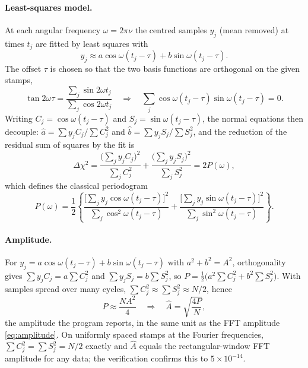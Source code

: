 \documentclass[10pt,letterpaper]{article}
\numberwithin{equation}{section}
\begin{document}
\paragraph{Least-squares model.} At each angular frequency $\omega = 2\pi\nu$ the
centred samples $y_j$ (mean removed) at times $t_j$ are fitted by least squares
\cite{B38,R13} with
\begin{equation}
y_j \approx a\cos\omega(t_j-\tau) + b\sin\omega(t_j-\tau).
\end{equation}
The offset $\tau$ is chosen so that the two basis functions are orthogonal on
the given stamps,
\begin{equation}
\tan 2\omega\tau = \frac{\sum_j \sin 2\omega t_j}{\sum_j \cos 2\omega t_j}
\quad\Longrightarrow\quad \sum_j \cos\omega(t_j-\tau)\sin\omega(t_j-\tau) = 0 .
\end{equation}
Writing $C_j = \cos\omega(t_j-\tau)$ and $S_j = \sin\omega(t_j-\tau)$, the normal
equations then decouple: $\hat{a} = \sum y_j C_j/\sum C_j^2$ and
$\hat{b} = \sum y_j S_j/\sum S_j^2$, and the reduction of the residual sum of
squares by the fit is
\begin{equation}
\Delta\chi^2 = \frac{\big(\sum_j y_j C_j\big)^2}{\sum_j C_j^2} + \frac{\big(\sum_j y_j S_j\big)^2}{\sum_j S_j^2} = 2P(\omega),
\end{equation}
which defines the classical periodogram
\begin{equation}
P(\omega) = \frac12\left\{\frac{\big[\sum_j y_j\cos\omega(t_j-\tau)\big]^2}{\sum_j\cos^2\omega(t_j-\tau)}
 + \frac{\big[\sum_j y_j\sin\omega(t_j-\tau)\big]^2}{\sum_j\sin^2\omega(t_j-\tau)}\right\}.
\end{equation}

\paragraph{Amplitude.} For $y_j = a\cos\omega(t_j-\tau) + b\sin\omega(t_j-\tau)$ with
$a^2+b^2 = A^2$, orthogonality gives $\sum y_j C_j = a\sum C_j^2$ and
$\sum y_j S_j = b\sum S_j^2$, so $P = \tfrac12\big(a^2\sum C_j^2 + b^2\sum S_j^2\big)$.
With samples spread over many cycles, $\sum C_j^2 \approx \sum S_j^2 \approx N/2$, hence
\begin{equation}
P \approx \frac{N A^2}{4}\quad\Longrightarrow\quad \hat{A} = \sqrt{\frac{4P}{N}},
\end{equation}
the amplitude the program reports, in the same unit as the FFT amplitude
\eqref{eq:amplitude}. On uniformly spaced stamps at the Fourier frequencies,
$\sum C_j^2 = \sum S_j^2 = N/2$ exactly and $\hat{A}$ equals the rectangular-window
FFT amplitude for any data; the verification confirms this to $5\times10^{-14}$.
\end{document}
